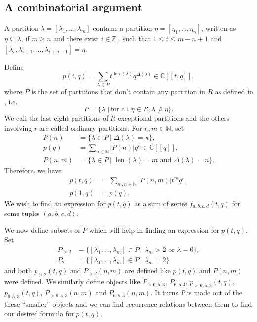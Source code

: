 \documentclass[a4paper, 12pt, reqno]{amsart}
\theoremstyle{remark}
\numberwithin{equation}{subsection}
\DeclareMathOperator{\len}{len}
\begin{document}
\subsection{A combinatorial argument}
\label{sec:comb-argum}

A partition $\lambda = [\lambda_1, \dots, \lambda_m]$ contains a partition $\eta = [\eta_1, \dots, \eta_n]$, written as $\eta \subseteq \lambda$, if $m \ge n$ and there exist $i \in \mathbb{Z}_+$ such that $1 \le i \le m - n + 1$ and $[\lambda_i, \lambda_{i + 1}, \dots, \lambda_{i + n - 1}] = \eta$.

Define
\begin{equation*}
  p(t, q) = \sum_{\lambda \in P}t^{\len(\lambda)}q^{\Delta(\lambda)} \in \mathbb{C}[[t, q]],
\end{equation*}
where $P$ is the set of partitions that don't contain any partition in $R$ as defined in , i.e.\
\begin{equation*}
  P = \{\lambda \mid \text{for all }\eta \in R, \lambda \nsupseteq \eta\}.
\end{equation*}
We call the last eight partitions of $R$ exceptional partitions and the others involving $r$ are called ordinary partitions.
For $n, m \in \mathbb{N}$, set
\begin{align*}
  P(n) &= \{\lambda \in P \mid \Delta(\lambda) = n\}, \\
  p(q) &= \sum_{n \in \mathbb{N}}|P(n)|q^n \in \mathbb{C}[[q]], \\
  P(n, m) &= \{\lambda \in P \mid \len(\lambda) = m\text{ and }\Delta(\lambda) = n\}.
\end{align*}
Therefore, we have
\begin{align*}
  p(t, q) &= \sum_{m, n \in \mathbb{N}}|P(n, m)|t^mq^n, \\
  p(1, q) &= p(q).
\end{align*}
We wish to find an expression for $p(t, q)$ as a sum of series $f_{a, b, c, d}(t, q)$ for some tuples $(a, b, c, d)$.

We now define subsets of $P$ which will help in finding an expression for $p(t, q)$.
Set
\begin{align*}
  P_{>2} &= \{[\lambda_1, \dots, \lambda_m] \in P \mid \lambda_m > 2\text{ or }\lambda = \emptyset\}, \\
  P_2 &= \{[\lambda_1, \dots, \lambda_m] \in P \mid \lambda_m = 2\}
\end{align*}
and both $p_{>2}(t, q)$ and $P_{>2}(n, m)$ are defined like $p(t, q)$ and $P(n, m)$ were defined.
We similarly define objects like $P_{>6, 5, 3}$, $P_{6, 5, 3}$, $p_{>6, 5, 3}(t, q)$, $p_{6, 5, 3}(t, q)$, $P_{>6, 5, 3}(n, m)$ and $P_{6, 5, 3}(n, m)$.
It turns $P$ is made out of the these ``smaller'' objects and we can find recurrence relations between them to find our desired formula for $p(t, q)$.
\end{document}

